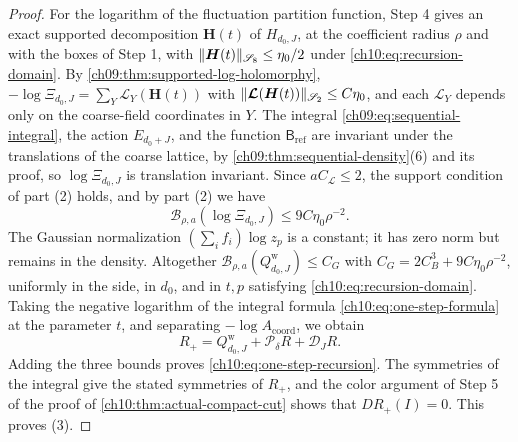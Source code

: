 \begin{proof}
For the logarithm of the fluctuation partition function, Step 4 gives an exact supported decomposition $\boldsymbol H(t)$ of $H_{d_0,J}$, at the coefficient radius $\rho$ and with the boxes of Step 1, with $\lVert \boldsymbol H(t)\rVert_{\mathscr S_8}\le\eta_0/2$ under \eqref{ch10:eq:recursion-domain}. By \cref{ch09:thm:supported-log-holomorphy}, $-\log\Xi_{d_0,J}=\sum_Y\mathcal L_Y(\boldsymbol H(t))$ with $\lVert \boldsymbol{\mathcal L}(\boldsymbol H(t))\rVert_{\mathscr S_2}\le C\eta_0$, and each $\mathcal L_Y$ depends only on the coarse-field coordinates in $Y$. The integral \eqref{ch09:eq:sequential-integral}, the action $E_{d_0+J}$, and the function $\mathsf B_{\mathrm{ref}}$ are invariant under the translations of the coarse lattice, by \cref{ch09:thm:sequential-density}(6) and its proof, so $\log\Xi_{d_0,J}$ is translation invariant. Since $aC_{\mathscr L}\le2$, the support condition of part (2) holds, and by part (2) we have
\[
 \mathcal B_{\rho,a}(\log\Xi_{d_0,J})\le9C\eta_0\rho^{-2}.
\]
The Gaussian normalization $(\sum_if_i)\log z_p$ is a constant; it has zero norm but remains in the density. Altogether $\mathcal B_{\rho,a}(Q_{d_0,J}^{\mathrm w})\le C_G$ with $C_G=2C_B^3+9C\eta_0\rho^{-2}$, uniformly in the side, in $d_0$, and in $t,p$ satisfying \eqref{ch10:eq:recursion-domain}. Taking the negative logarithm of the integral formula \eqref{ch10:eq:one-step-formula} at the parameter $t$, and separating $-\log A_{\mathrm{coord}}$, we obtain
\[
 R_+=Q_{d_0,J}^{\mathrm w}+\mathcal P_\delta R+\mathcal D_JR.
\]
Adding the three bounds proves \eqref{ch10:eq:one-step-recursion}. The symmetries of the integral give the stated symmetries of $R_+$, and the color argument of Step 5 of the proof of \cref{ch10:thm:actual-compact-cut} shows that $DR_+(I)=0$. This proves (3).


\end{proof}

